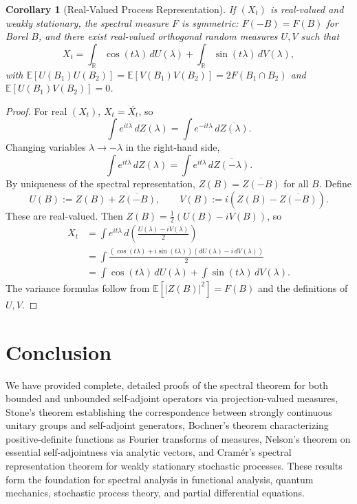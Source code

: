 \documentclass[11pt]{article}
\newtheorem{corollary}[theorem]{Corollary}
\theoremstyle{definition}
\theoremstyle{remark}
\newcommand{\R}{\mathbb{R}}
\newcommand{\E}{\mathbb{E}}
\newcommand{\1}{\mathbbm{1}}
\begin{document}
\begin{corollary}[Real-Valued Process Representation]\label{cor:real_process}
If $(X_t)$ is real-valued and weakly stationary, the spectral measure $F$ is symmetric: $F(-B)=F(B)$ for Borel $B$, and there exist real-valued orthogonal random measures $U,V$ such that
\[
X_t=\int_{\R}\cos(t\lambda)\,dU(\lambda)+\int_{\R}\sin(t\lambda)\,dV(\lambda),
\]
with $\E[U(B_1)U(B_2)]=\E[V(B_1)V(B_2)]=2F(B_1\cap B_2)$ and $\E[U(B_1)V(B_2)]=0$.
\end{corollary}

\begin{proof}
For real $(X_t)$, $X_t=\overline{X_t}$, so
\[
\int e^{it\lambda}\,dZ(\lambda)=\int e^{-it\lambda}\,d\overline{Z(\lambda)}.
\]
Changing variables $\lambda\to-\lambda$ in the right-hand side,
\[
\int e^{it\lambda}\,dZ(\lambda)=\int e^{it\lambda}\,d\overline{Z(-\lambda)}.
\]
By uniqueness of the spectral representation, $Z(B)=\overline{Z(-B)}$ for all $B$. Define
\[
U(B):=Z(B)+\overline{Z(-B)},\qquad V(B):=i(Z(B)-\overline{Z(-B)}).
\]
These are real-valued. Then $Z(B)=\frac{1}{2}(U(B)-iV(B))$, so
\begin{align*}
X_t&=\int e^{it\lambda}\,d\left(\frac{U(\lambda)-iV(\lambda)}{2}\right)\\
&=\int\frac{(\cos(t\lambda)+i\sin(t\lambda))(dU(\lambda)-i\,dV(\lambda))}{2}\\
&=\int\cos(t\lambda)\,dU(\lambda)+\int\sin(t\lambda)\,dV(\lambda).
\end{align*}
The variance formulas follow from $\E[|Z(B)|^2]=F(B)$ and the definitions of $U,V$.
\end{proof}

\section{Conclusion}

We have provided complete, detailed proofs of the spectral theorem for both bounded and unbounded self-adjoint operators via projection-valued measures, Stone's theorem establishing the correspondence between strongly continuous unitary groups and self-adjoint generators, Bochner's theorem characterizing positive-definite functions as Fourier transforms of measures, Nelson's theorem on essential self-adjointness via analytic vectors, and Cramér's spectral representation theorem for weakly stationary stochastic processes. These results form the foundation for spectral analysis in functional analysis, quantum mechanics, stochastic process theory, and partial differential equations.
\end{document}
